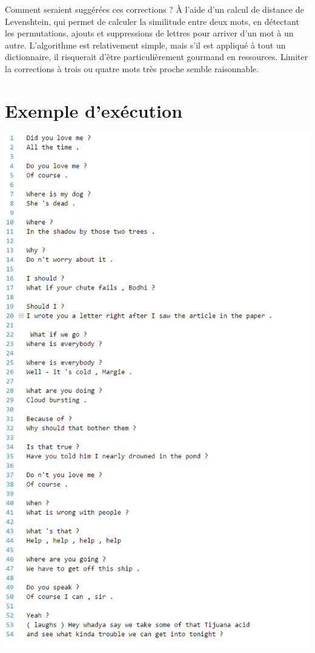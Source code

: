 Comment seraient suggérées ces corrections ? À l'aide d'un calcul de distance de Levenshtein, qui permet de calculer la similitude entre deux mots, en détectant les permutations, ajouts et suppressions de lettres pour arriver d'un mot à un autre. L'algorithme est relativement simple, mais s'il est appliqué à tout un dictionnaire, il risquerait d'être particulièrement gourmand en ressources. Limiter la corrections à trois ou quatre mots très proche semble raisonnable.

\section{Exemple d'exécution}

\includegraphics[scale=0.85]{executionCapture.PNG}